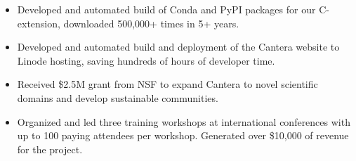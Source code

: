 \begin{itemize}
\item Developed and automated build of Conda and PyPI packages for our C-extension, downloaded 500,000+ times in 5+ years.
\item Developed and automated build and deployment of the Cantera website to Linode hosting, saving hundreds of hours of developer time.
\item Received \$2.5M grant from NSF to expand Cantera to novel scientific domains and develop sustainable communities.
\item Organized and led three training workshops at international conferences with up to 100 paying attendees per workshop. Generated over \$10,000 of revenue for the project.
\end{itemize}
\sectionsep



